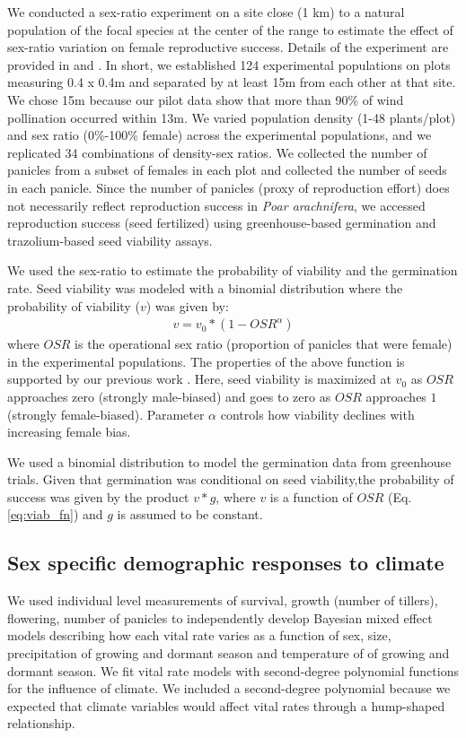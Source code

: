 \documentclass[11pt]{article}
\begin{document}
We conducted a sex-ratio experiment on a site close (1 km) to a natural population of the focal species at the center of the range to estimate the effect of sex-ratio variation on female reproductive success.
Details of the experiment are provided in \cite{compagnoni2017can} and \cite{miller2022two}.
In short, we established 124 experimental populations on plots measuring 0.4 x 0.4m and separated by at least 15m from each other at that site. 
We chose 15m because our pilot data show that more than 90\% of wind pollination occurred within 13m. 
We varied population density (1-48 plants/plot) and sex ratio (0\%-100\% female) across the experimental populations, and we replicated 34 combinations of density-sex ratios. 
We collected the number of panicles from a subset of females in each plot and collected the number of seeds in each panicle.
Since the number of panicles (proxy of reproduction effort) does not necessarily reflect reproduction success in \textit{Poar arachnifera}, we accessed reproduction success (seed fertilized) using greenhouse-based germination and trazolium-based seed viability assays. 

We used the sex-ratio to estimate the probability of viability and the germination rate. 
Seed viability was modeled with a binomial distribution where the probability of viability ($v$) was given by:
\begin{align}\label{eq:viab_fn}
v = v_{0} * (1 - OSR^{\alpha})
\end{align}
\noindent where $OSR$ is the operational sex ratio (proportion of panicles that were female) in the experimental populations.
The properties of the above function is supported by our previous work \citep{compagnoni2017can}. 
Here, seed viability is maximized at $v_{0}$ as $OSR$ approaches zero (strongly male-biased) and goes to zero as $OSR$ approaches $1$ (strongly female-biased).
Parameter $\alpha$ controls how viability declines with increasing female bias.

We used a binomial distribution to model the germination data from greenhouse trials.
Given that germination was conditional on seed viability,the probability of success was given by the product $v*g$, where $v$ is a function of $OSR$ (Eq. \ref{eq:viab_fn}) and $g$ is assumed to be constant.

\subsection*{Sex specific demographic responses to climate}
We used individual level measurements of survival, growth (number of tillers), flowering, number of panicles to independently develop Bayesian mixed effect models describing how each vital rate varies as a function of sex, size, precipitation of growing and dormant season and temperature of of growing and dormant season. 
We fit vital rate models with second-degree polynomial functions for the influence of climate.
We included a second-degree polynomial because we expected that climate variables would affect vital rates through a hump-shaped relationship. 
\end{document}
